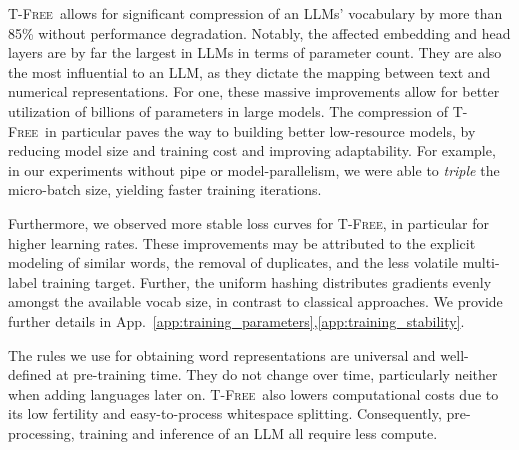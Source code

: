 \documentclass[11pt]{article}
\newcommand{\method}{\textsc{T-Free}}
\begin{document}
 \method\ allows for significant compression of an LLMs' vocabulary by more than 85\% without performance degradation. 
 Notably, the affected embedding and head layers are by far the largest in LLMs in terms of parameter count. They are also the most influential to an LLM, as they dictate the mapping between text and numerical representations. For one, these massive improvements allow for better utilization of billions of parameters in large models.
 The compression of \method~in particular paves the way to building better low-resource models, by reducing model size and training cost and improving adaptability. 
 For example, in our experiments without pipe or model-parallelism, we were able to \emph{triple} the micro-batch size, yielding faster training iterations.
 

Furthermore, we observed more stable loss curves for \method, in particular for higher learning rates. These improvements may be attributed to the explicit modeling of similar words, the removal of duplicates, and the less volatile multi-label training target.
Further, the uniform hashing distributes gradients evenly amongst the available vocab size, in contrast to classical approaches.
We provide further details in App.~\ref{app:training_parameters},\ref{app:training_stability}.

The rules we use for obtaining word representations are universal and well-defined at pre-training time. They do not change over time, particularly neither when adding languages later on.
\method\ also lowers computational costs due to its low fertility and easy-to-process whitespace splitting. Consequently, pre-processing, training and inference of an LLM all require less compute. 
\end{document}
